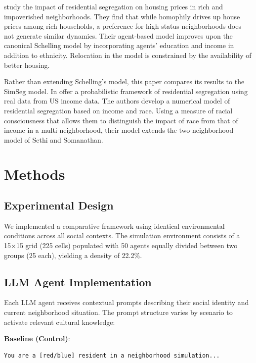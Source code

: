 \documentclass[pdflatex,sn-basic]{sn-jnl}%
\begin{document}
\citet{bonakdar2023dissimilarity} study the impact of residential segregation on housing prices in rich and impoverished neighborhoods. They find that while homophily drives up house prices among rich households, a preference for high-status neighborhoods does not generate similar dynamics. 
Their agent-based model improves upon the canonical Schelling model by incorporating agents' education and income in addition to ethnicity. Relocation in the model is constrained by the availability of better housing.

Rather than extending Schelling’s model, this paper compares its results to the SimSeg model. In \citet{li2020racial} offer a probabilistic framework of residential segregation using real data from US income data. The authors develop a numerical model of residential segregation based on income and race. Using a measure of racial consciousness that allows them to distinguish the impact of race from that of income in a multi-neighborhood, their model extends the two-neighborhood model of Sethi and Somanathan. 



\section{Methods}\label{methods}

\subsection{Experimental Design}\label{experimental-design}

We implemented a comparative framework using identical environmental
conditions across all social contexts. The simulation environment
consists of a 15×15 grid (225 cells) populated with 50 agents equally
divided between two groups (25 each), yielding a density of 22.2\%.

\subsection{LLM Agent Implementation}\label{llm-agent-implementation}

Each LLM agent receives contextual prompts describing their social
identity and current neighborhood situation. The prompt structure varies
by scenario to activate relevant cultural knowledge:

\textbf{Baseline (Control)}:
\begin{verbatim}
You are a [red/blue] resident in a neighborhood simulation...
\end{verbatim}
\end{document}
